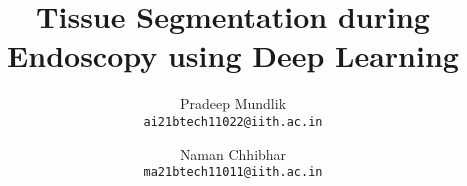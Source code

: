 \documentclass[10pt, twocolumn, letterpaper]{article}
\title{Tissue Segmentation during Endoscopy using Deep Learning}
\author{
    Pradeep Mundlik \\
    {\tt\small ai21btech11022@iith.ac.in}
    \and
    Naman Chhibhar \\
    {\tt\small ma21btech11011@iith.ac.in}
}
\begin{document}
\maketitle
    





{
    \small
    \nocite{*}
    
}

% 
\end{document}
